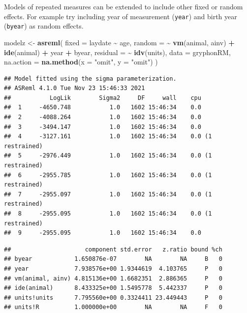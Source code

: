 \documentclass[
  12pt,
]{book}
\newenvironment{Shaded}{\begin{snugshade}}{\end{snugshade}}
\newcommand{\DataTypeTok}[1]{\textcolor[rgb]{0.13,0.29,0.53}{#1}}
\newcommand{\KeywordTok}[1]{\textcolor[rgb]{0.13,0.29,0.53}{\textbf{#1}}}
\newcommand{\NormalTok}[1]{#1}
\newcommand{\OperatorTok}[1]{\textcolor[rgb]{0.81,0.36,0.00}{\textbf{#1}}}
\newcommand{\StringTok}[1]{\textcolor[rgb]{0.31,0.60,0.02}{#1}}
\begin{document}
Models of repeated measures can be extended to include other fixed or random effects. For example try including year of measurement (\texttt{year}) and birth year (\texttt{byear}) as random effects.

\begin{Shaded}
\begin{Highlighting}[]
\NormalTok{modelz \textless{}{-}}\StringTok{ }\KeywordTok{asreml}\NormalTok{(}
  \DataTypeTok{fixed =}\NormalTok{ laydate }\OperatorTok{\textasciitilde{}}\StringTok{ }\NormalTok{age,}
  \DataTypeTok{random =} \OperatorTok{\textasciitilde{}}\StringTok{ }\KeywordTok{vm}\NormalTok{(animal, ainv) }\OperatorTok{+}\StringTok{ }\KeywordTok{ide}\NormalTok{(animal) }\OperatorTok{+}
\StringTok{    }\NormalTok{year }\OperatorTok{+}\StringTok{ }\NormalTok{byear,}
  \DataTypeTok{residual =} \OperatorTok{\textasciitilde{}}\StringTok{ }\KeywordTok{idv}\NormalTok{(units),}
  \DataTypeTok{data =}\NormalTok{ gryphonRM,}
  \DataTypeTok{na.action =} \KeywordTok{na.method}\NormalTok{(}\DataTypeTok{x =} \StringTok{"omit"}\NormalTok{, }\DataTypeTok{y =} \StringTok{"omit"}\NormalTok{)}
\NormalTok{)}
\end{Highlighting}
\end{Shaded}

\begin{verbatim}
## Model fitted using the sigma parameterization.
## ASReml 4.1.0 Tue Nov 23 15:46:33 2021
##           LogLik        Sigma2     DF     wall    cpu
##  1     -4650.748           1.0   1602 15:46:34    0.0
##  2     -4088.264           1.0   1602 15:46:34    0.0
##  3     -3494.147           1.0   1602 15:46:34    0.0
##  4     -3127.161           1.0   1602 15:46:34    0.0 (1 restrained)
##  5     -2976.449           1.0   1602 15:46:34    0.0 (1 restrained)
##  6     -2955.785           1.0   1602 15:46:34    0.0 (1 restrained)
##  7     -2955.097           1.0   1602 15:46:34    0.0 (1 restrained)
##  8     -2955.095           1.0   1602 15:46:34    0.0 (1 restrained)
##  9     -2955.095           1.0   1602 15:46:34    0.0
\end{verbatim}

\begin{Shaded}
\end{Shaded}

\begin{verbatim}
##                     component std.error   z.ratio bound %ch
## byear            1.650876e-07        NA        NA     B   0
## year             7.938576e+00 1.9344619  4.103765     P   0
## vm(animal, ainv) 4.815136e+00 1.6682351  2.886365     P   0
## ide(animal)      8.433325e+00 1.5495778  5.442337     P   0
## units!units      7.795560e+00 0.3324411 23.449443     P   0
## units!R          1.000000e+00        NA        NA     F   0
\end{verbatim}
\end{document}
